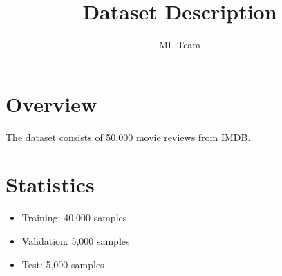 \documentclass{article}
\begin{document}
\title{Dataset Description}
\author{ML Team}
\maketitle

\section{Overview}
The dataset consists of 50,000 movie reviews from IMDB.

\section{Statistics}
\begin{itemize}
  \item Training: 40,000 samples
  \item Validation: 5,000 samples
  \item Test: 5,000 samples
\end{itemize}
\end{document}
